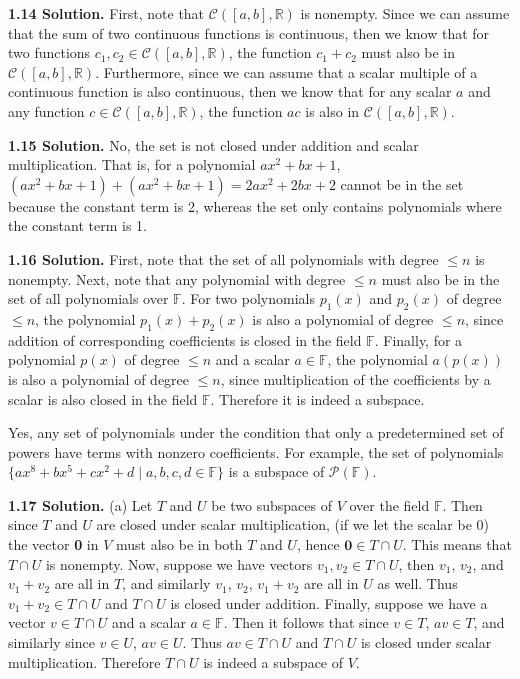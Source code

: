 \textbf{1.14 Solution.} First, note that $\mathcal{C}([a,b],\mathbb{R})$ is nonempty. Since we can assume that the sum of two continuous functions is continuous, then we know that for two functions $c_1, c_2\in\mathcal{C}([a,b], \mathbb{R})$, the function $c_1+c_2$ must also be in $\mathcal{C}([a,b], \mathbb{R})$. Furthermore, since we can assume that a scalar multiple of a continuous function is also continuous, then we know that for any scalar $a$ and any function $c\in\mathcal{C}([a,b],\mathbb{R})$, the function $ac$ is also in $\mathcal{C}([a,b],\mathbb{R})$.

\textbf{1.15 Solution.} No, the set is not closed under addition and scalar multiplication. That is, for a polynomial $ax^2+bx+1$, $(ax^2+bx+1)+(ax^2+bx+1)= 2ax^2+2bx+2$ cannot be in the set because the constant term is 2, whereas the set only contains polynomials where the constant term is 1.

\textbf{1.16 Solution.} First, note that the set of all polynomials with degree $\leq n$ is nonempty. Next, note that any polynomial with degree $\leq n$ must also be in the set of all polynomials over $\mathbb{F}$. For two polynomials $p_1(x)$ and $p_2(x)$ of degree $\leq n$, the polynomial $p_1(x)+p_2(x)$ is also a polynomial of degree $\leq n$, since addition of corresponding coefficients is closed in the field $\mathbb{F}$. Finally, for a polynomial $p(x)$ of degree $\leq n$ and a scalar $a\in\mathbb{F}$, the polynomial $a(p(x))$ is also a polynomial of degree $\leq n$, since multiplication of the coefficients by a scalar is also closed in the field $\mathbb{F}$. Therefore it is indeed a subspace.

Yes, any set of polynomials under the condition that only a predetermined set of powers have terms with nonzero coefficients. For example, the set of polynomials $\{ax^8+bx^5+cx^2+d\mid a,b,c,d\in\mathbb{F}\}$ is a subspace of $\mathcal{P}(\mathbb{F})$.

\textbf{1.17 Solution.}
(a) Let $T$ and $U$ be two subspaces of $V$ over the field $\mathbb{F}$. Then since $T$ and $U$ are closed under scalar multiplication, (if we let the scalar be 0) the vector \textbf{0} in $V$ must also be in both $T$ and $U$, hence $\textbf{0}\in T\cap U$. This means that $T\cap U$ is nonempty. Now, suppose we have vectors $v_1,v_2\in T\cap U$, then $v_1$, $v_2$, and $v_1+v_2$ are all in $T$, and similarly $v_1$, $v_2$, $v_1+v_2$ are all in $U$ as well. Thus $v_1+v_2\in T\cap U$ and $T\cap U$ is closed under addition. Finally, suppose we have a vector $v\in T\cap U$ and a scalar $a\in\mathbb{F}$. Then it follows that since $v\in T$, $av\in T$, and similarly since $v\in U$, $av\in U$. Thus $av\in T\cap U$ and $T\cap U$ is closed under scalar multiplication. Therefore $T\cap U$ is indeed a subspace of $V$.

